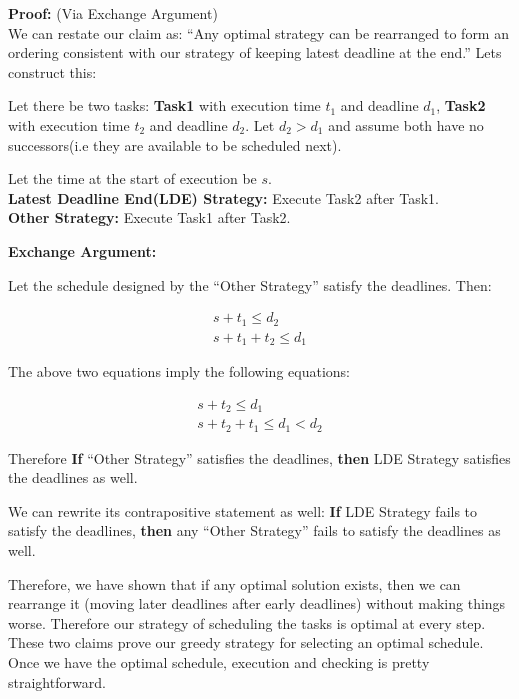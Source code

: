 \documentclass[11pt, fleqn]{article}
\begin{document}
\medskip

\textbf{Proof:} (Via Exchange Argument)\\
We can restate our claim as: ``Any optimal strategy can be rearranged to form an ordering consistent with our strategy of keeping latest deadline at the end.'' Lets construct this:

\medskip

Let there be two tasks: \textbf{Task1} with execution time $t_1$ and deadline $d_1$, \textbf{Task2} with execution time $t_2$ and deadline $d_2$. Let $d_2 > d_1$ and assume both have no successors(i.e they are available to be scheduled next).

Let the time at the start of execution be $s$.
\\

\textbf{Latest Deadline End(LDE) Strategy:} Execute Task2 after Task1.
\\

\textbf{Other Strategy:} Execute Task1 after Task2.

\medskip

\textbf{Exchange Argument:}

\medskip

Let the schedule designed by the ``Other Strategy'' satisfy the deadlines. Then:

\begin{gather}
    s + t_1 \leq d_2 \\
    s + t_1 + t_2 \leq d_1
\end{gather}

The above two equations imply the following equations:

\begin{gather}
    s + t_2 \leq d_1 \\
    s + t_2 + t_1 \leq d_1 < d_2
\end{gather}

Therefore \textbf{If} ``Other Strategy'' satisfies the deadlines, \textbf{then} LDE Strategy satisfies the deadlines as well.
\medskip

We can rewrite its contrapositive statement as well: \textbf{If} LDE Strategy fails to satisfy the deadlines, \textbf{then} any ``Other Strategy'' fails to satisfy the deadlines as well.
\medskip

Therefore, we have shown that if any optimal solution exists, then we can rearrange it (moving later deadlines after early deadlines) without making things worse. Therefore our strategy of scheduling the tasks is optimal at every step. These two claims prove our greedy strategy for selecting an optimal schedule. Once we have the optimal schedule, execution and checking is pretty straightforward.
\end{document}
